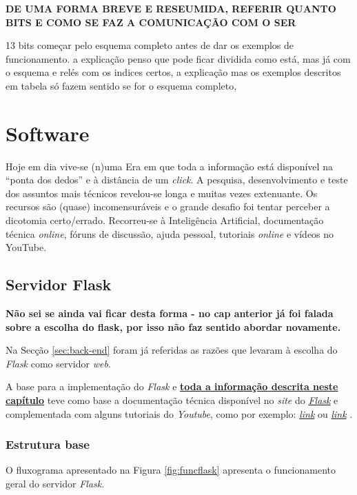 \textbf{DE UMA FORMA BREVE E RESEUMIDA, REFERIR QUANTO BITS E COMO SE FAZ A COMUNICAÇÃO COM O SER}

13 bits começar pelo esquema completo antes de dar os exemplos de funcionamento. a explicação penso que pode ficar dividida como está, mas já com o esquema e relés com os indices certos, a explicação mas os exemplos descritos em tabela só fazem sentido se for o esquema completo,

\section{Software}
Hoje em dia vive-se (n)uma Era em que toda a informação está disponível na ``ponta dos dedos'' e à distância de um \textit{click}. A pesquisa, desenvolvimento e teste dos assuntos mais técnicos revelou-se longa e muitas vezes extenuante. Os recursos são (quase) incomensuráveis e o grande desafio foi tentar perceber a dicotomia certo/errado. Recorreu-se à Inteligência Artificial, documentação técnica \textit{online}, fóruns de discussão, ajuda pessoal, tutoriais \textit{online} e vídeos no YouTube.

\subsection{Servidor Flask}
\label{sec:flask}
\textbf{Não sei se ainda vai ficar desta forma - no cap anterior já foi falada sobre a escolha do flask, por isso não faz sentido abordar novamente.}

Na Secção \ref{sec:back-end} foram já referidas as razões que levaram à escolha do \textit{Flask} como servidor \textit{web}. 

A base para a implementação do \textit{Flask} e \underline{\textbf{toda a informação descrita neste}} \underline{\textbf{capítulo}} teve como base a documentação técnica disponível no \textit{site} do \href{https://flask.palletsprojects.com/en/3.0.x/}{\textit{Flask}} e complementada com alguns tutoriais do \textit{Youtube}, como por exemplo: \href{https://www.youtube.com/watch?v=dam0GPOAvVI}{\textit{link}} ou \href{https://www.youtube.com/watch?v=bB6Yyh7nUl4}{\textit{link}} .

\subsubsection{Estrutura base}
O fluxograma apresentado na Figura \ref{fig:funcflask} apresenta o funcionamento geral do servidor \textit{Flask}.

